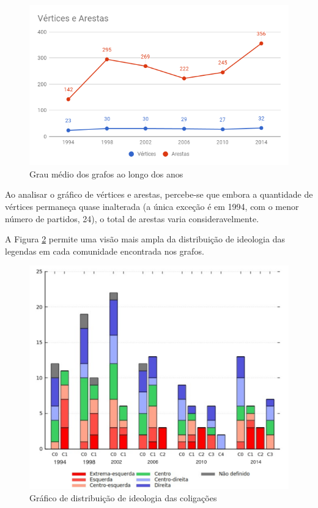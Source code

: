 \begin{figure}[H]
\includegraphics[width=1\textwidth]{4-resultados/graficos/vertices-arestas.png}
\centering
\caption{
    Grau médio dos grafos ao longo dos anos
}
\label{fig:grafico-verticesarestas}
\end{figure}

Ao analisar o gráfico de vértices e arestas, percebe-se que embora a quantidade de vértices permaneça quase inalterada (a única exceção é em 1994, com o menor número de partidos, 24), o total de arestas varia consideravelmente.


A Figura \ref{fig:grafico-comunidades} permite uma visão mais ampla da distribuição de ideologia das legendas em cada comunidade encontrada nos grafos.

\begin{figure}[H]
\includegraphics[width=1\textwidth]{4-resultados/graficos/grafico-geral.pdf}
\centering
\caption{
    Gráfico de distribuição de ideologia das coligações
}
\label{fig:grafico-comunidades}
\end{figure}


